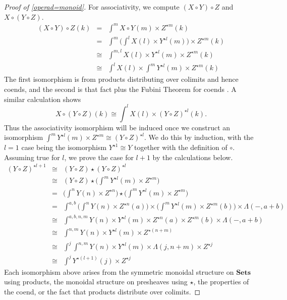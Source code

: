 \documentclass{amsbook} %
\newcommand{\mb}{\mathbf}
\numberwithin{section}{chapter}
\begin{document}
\begin{proof}[Proof of \ref{operad=monoid}]
For associativity, we compute $(X \circ Y) \circ Z$ and $X \circ (Y \circ Z)$.
\[
\begin{array}{rcl}
(X \circ Y) \circ Z (k) & = & \int^{m} X \circ Y (m) \times Z^{\star m}(k) \\
& = & \int^{m} \big( \int^{l} X(l) \times Y^{\star l}(m) \big) \times Z^{\star m}(k) \\
& \cong & \int^{m,l} X(l) \times Y^{\star l}(m) \times Z^{\star m}(k) \\
& \cong & \int^{l} X(l) \times \int^{m} Y^{\star l}(m) \times Z^{\star m}(k)
\end{array}
\]
The first isomorphism is from products distributing over colimits and hence coends, and the second is that fact plus the Fubini Theorem for coends \cite{maclane-catwork}.  A similar calculation shows
\[
X \circ (Y \circ Z)(k) \cong \int^{l} X(l) \times (Y \circ Z)^{\star l}(k).
\]
Thus the associativity isomorphism will be induced once we construct an isomorphism $\int^{m} Y^{\star l}(m) \times Z^{\star m} \cong (Y \circ Z)^{\star l}$.  We do this by induction, with the $l=1$ case being the isomorphism $Y^{\star 1} \cong Y$ together with the definition of $\circ.$  Assuming true for $l$, we prove the case for $l+1$ by the calculations below.
\[
\begin{array}{rcl}
(Y \circ Z)^{\star l+1} & \cong & (Y \circ Z) \star (Y \circ Z)^{\star l} \\
& \cong & (Y \circ Z) \star \big( \int^{m} Y^{\star l}(m) \times Z^{\star m} \big) \\
& = & \big( \int^{n} Y(n) \times Z^{\star n} \big) \star \big( \int^{m} Y^{\star l}(m) \times Z^{\star m} \big) \\
& = & \int^{a,b} \big( \int^{n} Y(n) \times Z^{\star n}(a) \big)  \times \big( \int^{m} Y^{\star l}(m) \times Z^{\star m}(b) \big) \times \mathbb{\Lambda}(-, a+b) \\
& \cong & \int^{a,b,n,m} Y(n) \times Y^{\star l}(m) \times Z^{\star n}(a) \times Z^{\star m}(b) \times  \mathbb{\Lambda}(-, a+b) \\
& \cong & \int^{n,m} Y(n) \times Y^{\star l}(m) \times Z^{\star (n+m)} \\
& \cong & \int^{j} \int^{n,m} Y(n) \times Y^{\star l}(m) \times \mathbb{\Lambda}(j, n+m) \times Z^{\star j} \\
& \cong & \int^{j} Y^{\star (l+1)}(j) \times Z^{\star j}
\end{array}
\]
Each isomorphism above arises from the symmetric monoidal structure on $\mb{Sets}$ using products, the monoidal structure on presheaves using $\star$, the properties of the coend, or the fact that products distribute over colimits.


\end{proof}
\end{document}

